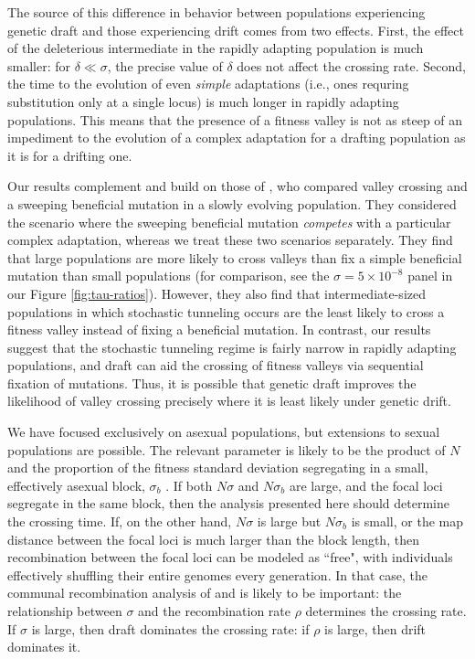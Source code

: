 \documentclass[10pt,twocolumn,twoside]{gsajnl}
\begin{document}
\begin{spacing}{1.5}
The source of this difference in behavior between populations experiencing genetic draft and those experiencing drift comes from two effects.
First, the effect of the deleterious intermediate in the rapidly adapting population is much smaller: for $\delta \ll \sigma$, the precise value of $\delta$ does not affect the crossing rate.
Second, the time to the evolution of even \emph{simple} adaptations (i.e., ones requring substitution only at a single locus) is much longer in rapidly adapting populations.
This means that the presence of a fitness valley is not as steep of an impediment to the evolution of a complex adaptation for a drafting population as it is for a drifting one.

Our results complement and build on those of \citet{ochs_2015}, who compared valley crossing and a sweeping beneficial mutation in a slowly evolving population.
They considered the scenario where the sweeping beneficial mutation \emph{competes} with a particular complex adaptation, whereas we treat these two scenarios separately.
They find that large populations are more likely to cross valleys than fix a simple beneficial mutation than small populations (for comparison, see the $\sigma=5 \times 10^{-8}$ panel in our Figure \ref{fig:tau-ratios}).
However, they also find that intermediate-sized populations in which stochastic tunneling occurs are the least likely to cross a fitness valley instead of fixing a beneficial mutation.
In contrast, our results suggest that the stochastic tunneling regime is fairly narrow in rapidly adapting populations, and draft can aid the crossing of fitness valleys via sequential fixation of mutations.
Thus, it is possible that genetic draft improves the likelihood of valley crossing precisely where it is least likely under genetic drift. 

We have focused exclusively on asexual populations, but extensions to sexual populations are possible.
The relevant parameter is likely to be the product of $N$ and the proportion of the fitness standard deviation segregating in a small, effectively asexual block, $\sigma_b$ \citep{neher_kessinger_2013}.
If both $N\sigma$ and $N\sigma_b$ are large, and the focal loci segregate in the same block, then the analysis presented here should determine the crossing time.
If, on the other hand, $N\sigma$ is large but $N\sigma_b$ is small, or the map distance between the focal loci is much larger than the block length, then recombination between the focal loci can be modeled as ``free", with individuals effectively shuffling their entire genomes every generation.
In that case, the communal recombination analysis of \citet{neher_shraiman_2011} and \citet{neher_shraiman_2010} is likely to be important: the relationship between $\sigma$ and the recombination rate $\rho$ determines the crossing rate.
If $\sigma$ is large, then draft dominates the crossing rate: if $\rho$ is large, then drift dominates it.


\end{spacing}
\end{document}
